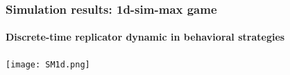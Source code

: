 \documentclass[fleqn,9pt,xcolor=dvipsnames]{beamer}
\newcommand{\mygray}[1]{{\color{gray}{#1}}}
\newcommand{\slideFN}[1]{%
  \begin{textblock*}{\paperwidth}(0pt,1.05\textheight)
    \hfill \footnotesize{\mygray{#1}} \hspace{.5em}
  \end{textblock*}}
\begin{document}

\begin{frame}
  \frametitle{Simulation results: 1d-sim-max game}
  \framesubtitle{Discrete-time replicator dynamic in behavioral
    strategies}
    \vspace{.3cm}
    \begin{center}

      \texttt{[image: SM1d.png]}

    \end{center}

 \href{run:myexec_SM1d}{}
\end{frame}









\end{document}
